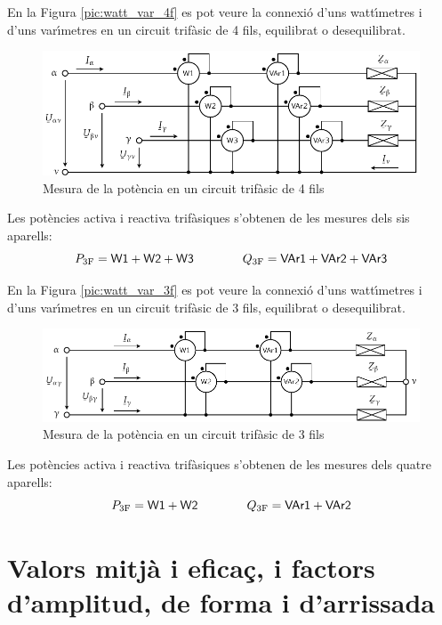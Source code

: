 En la Figura \vref{pic:watt_var_4f} es pot veure la connexi\'{o} d'uns
watt\'{\i}metres i d'uns var\'{\i}metres en un circuit trif\`{a}sic de 4 fils,
equilibrat o desequilibrat.
\begin{figure}[htb]
\centering
    \includegraphics{Imatges/Cap-Fonaments-Mesura-Potencia-Trif-4f.pdf}
\caption{Mesura de la pot\`{e}ncia en un circuit  trif\`{a}sic de 4 fils}
\label{pic:watt_var_4f}
\end{figure}

Les pot\`{e}ncies activa i reactiva trif\`{a}siques s'obtenen de les mesures
dels sis aparells:
\begin{equation}
    P_\mathrm{3F} = \textsf{W1} +  \textsf{W2} + \textsf{W3}
    \qquad\qquad Q_\mathrm{3F} = \textsf{VAr1} +  \textsf{VAr2} + \textsf{VAr3}
\end{equation}

En la Figura \vref{pic:watt_var_3f} es pot veure la connexi\'{o} d'uns
watt\'{\i}metres i d'uns var\'{\i}metres en un circuit trif\`{a}sic de 3 fils,
equilibrat o desequilibrat.
\begin{figure}[htb]
\centering
    \includegraphics{Imatges/Cap-Fonaments-Mesura-Potencia-Trif-3f.pdf}
\caption{Mesura de la pot\`{e}ncia en un circuit  trif\`{a}sic de 3 fils}
\label{pic:watt_var_3f}
\end{figure}

Les pot\`{e}ncies activa i reactiva trif\`{a}siques s'obtenen de les mesures
dels quatre aparells:
\begin{equation}
    P_\mathrm{3F} = \textsf{W1} +  \textsf{W2}
    \qquad\qquad Q_\mathrm{3F} = \textsf{VAr1} +  \textsf{VAr2}
\end{equation}

\section{Valors mitj\`{a} i efica\c{c}, i factors d'amplitud, de forma i
d'arrissada}\label{sec:val_mitja_ef}

